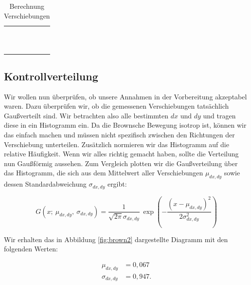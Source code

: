 \documentclass{article}
\begin{document}
\begin{table}[!p]
\begin{minipage}{0.5\textwidth}
{\begin{tabular}{cccc}
\phantom{.} \\
\phantom{.} \\
\phantom{.} \\
\phantom{.} \\
\phantom{.} \\
\phantom{.} \\
\phantom{.} \\
\phantom{.} \\
\phantom{.} \\
\phantom{.} \\
\phantom{.} \\
\bottomrule
\end{tabular}}

\end{minipage}

\caption{Berechnung Verschiebungen}
\label{tab:Verschiebung}
\end{table}


\clearpage
\newpage

\subsection{Kontrollverteilung} \label{Hist}

Wir wollen nun überprüfen, ob unsere Annahmen in der Vorbereitung akzeptabel waren. Dazu überprüfen wir, ob die gemessenen Verschiebungen tatsächlich Gaußverteilt sind. Wir betrachten also alle bestimmten $dx$ und $dy$ und tragen diese in ein Histogramm ein. Da die Brownsche Bewegung isotrop ist, können wir das einfach machen und müssen nicht spezifisch zwischen den Richtungen der Verschiebung unterteilen. Zusätzlich normieren wir das Histogramm auf die relative Häufigkeit. Wenn wir alles richtig gemacht haben, sollte die Verteilung nun Gaußförmig aussehen. Zum Vergleich plotten wir die Gaußverteilung über das Histogramm, die sich aus dem Mittelwert aller Verschiebungen $\mu_{dx,dy}$ sowie dessen Standardabweichung $\sigma_{dx,dy}$ ergibt:

\begin{equation}
    G(x; \ \mu_{dx,dy}, \ \sigma_{dx,dy}) = \frac{1}{\sqrt{2 \pi} \sigma_{dx,dy}} \ \exp{\left( - \frac{(x-\mu_{dx,dy})^2}{2\sigma_{dx,dy}^2} \right)}
\end{equation}

Wir erhalten das in Abbildung \ref{fig:brown2} dargestellte Diagramm mit den folgenden Werten:

\begin{equation}
    \begin{split}
        \mu_{dx,dy} &= 0,067 \\
        \sigma_{dx,dy} &= 0,947.
    \end{split}
\end{equation}
\end{document}
